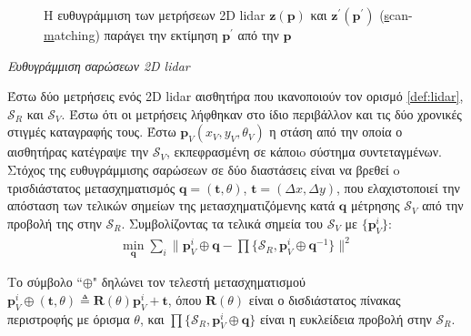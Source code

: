 \begin{figure}[htbp]\centering
  
  \vspace{0.5cm}
  \caption{\small Η ευθυγράμμιση των μετρήσεων 2D lidar $\bm{z}(\bm{p})$ και
           $\bm{z}^\prime(\bm{p}^\prime)$ (\underline{s}can-\underline{m}atching)
           παράγει την εκτίμηση $\bm{p}^\prime$ από την $\bm{p}$}
  \label{fig:sm_principle}
\end{figure}

\begin{bw_box}
\begin{definition}
\label{def:sm}
\textit{Ευθυγράμμιση σαρώσεων 2D lidar}

Έστω δύο μετρήσεις ενός 2D lidar αισθητήρα που ικανοποιούν τον ορισμό
\ref{def:lidar}, $\mathcal{S}_R$ και $\mathcal{S}_V$. Έστω ότι οι μετρήσεις
λήφθηκαν στο ίδιο περιβάλλον και τις δύο χρονικές στιγμές καταγραφής τους. Έστω
$\bm{p}_V(x_V,y_V,\theta_V)$ η στάση από την οποία ο αισθητήρας κατέγραψε την
$\mathcal{S}_V$, εκπεφρασμένη σε κάποιo σύστημα συντεταγμένων.  Στόχος της
ευθυγράμμισης σαρώσεων σε δύο διαστάσεις είναι να βρεθεί o τρισδιάστατος
μετασχηματισμός $\bm{q} = (\bm{t}, \theta)$, $\bm{t} = (\Delta x, \Delta y)$,
που ελαχιστοποιεί την απόσταση των τελικών σημείων της μετασχηματιζόμενης κατά
$\bm{q}$ μέτρησης $\mathcal{S}_V$ από την προβολή της στην $\mathcal{S}_R$.
Συμβολίζοντας τα τελικά σημεία του $\mathcal{S}_V$ με $\{\bm{p}_V^i\}$:
\begin{align}
  \underset{\bm{q}}{\min} \sum\limits_i \Big\| \bm{p}_V^i \oplus \bm{q} - \prod \{ \mathcal{S}_R, \bm{p}_V^i \oplus \bm{q}^{-1} \}\Big\|^2
  \label{eq:sm_def}
\end{align}

Το σύμβολο ``$\oplus$" δηλώνει τον τελεστή μετασχηματισμού $\bm{p}_V^i \oplus
(\bm{t}, \theta) \triangleq \bm{R}(\theta) \bm{p}^i_V + \bm{t}$, όπου
$\bm{R}(\theta)$ είναι ο δισδιάστατος πίνακας περιστροφής με όρισμα
$\theta$, και $\prod\{\mathcal{S}_R, \bm{p}_V^i \oplus \bm{q} \}$ είναι η
ευκλείδεια προβολή στην $\mathcal{S}_R$.
\end{definition}
\end{bw_box}




